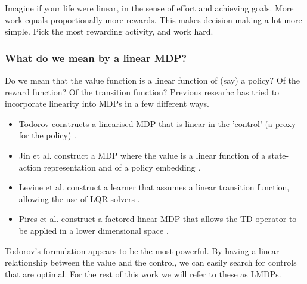 
Imagine if your life were linear, in the sense of effort and achieving goals.
More work equals proportionally more rewards. This makes decision making
a lot more simple. Pick the most rewarding activity, and work hard.

\subsubsection{What do we mean by a linear MDP?}

Do we mean that the value function is a linear function of (say) a policy?
Of the reward function? Of the transition function? Previous researhc has tried to incorporate
linearity into MDPs in a few different ways.

\begin{itemize}
  \tightlist
  \item Todorov constructs a linearised MDP that is linear in the 'control' (a proxy for the policy) \cite{Todorov2006}.
  \item Jin et al. construct a MDP where the value is a linear function of a state-action representation and of a policy embedding \cite{Wang}.
  \item Levine et al. construct a learner that assumes a linear transition function, allowing the use of \href{https://en.wikipedia.org/wiki/Linear%E2%80%93quadratic_regulator}{LQR} solvers \cite{Levine2019}.
  \item Pires et al. construct a factored linear MDP that allows the TD operator to be applied in a lower dimensional space \cite{Pires2016}.
\end{itemize}

Todorov's formulation appears to be the most powerful. By having a linear
relationship between the value and the control, we can easily search for controls that
are optimal. For the rest of this work we will refer to these as LMDPs.


